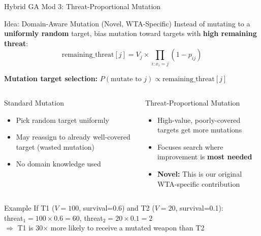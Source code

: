 \documentclass[aspectratio=43,8pt]{beamer}
\begin{document}
\begin{frame}{Hybrid GA Mod 3: Threat-Proportional Mutation}
\begin{block}{Idea: Domain-Aware Mutation (Novel, WTA-Specific)}
Instead of mutating to a \textbf{uniformly random} target, bias mutation toward targets with \textbf{high remaining threat}:
$$\text{remaining\_threat}[j] = V_j \times \prod_{i: x_i = j} (1 - p_{ij})$$

\textbf{Mutation target selection:} $P(\text{mutate to } j) \propto \text{remaining\_threat}[j]$
\end{block}

\vspace{0.2cm}
\begin{columns}[t]
\begin{exampleblock}{Standard Mutation}
\begin{itemize}
    \item Pick random target uniformly
    \item May reassign to already well-covered target (wasted mutation)
    \item No domain knowledge used
\end{itemize}
\end{exampleblock}

\begin{alertblock}{Threat-Proportional Mutation}
\begin{itemize}
    \item High-value, poorly-covered targets get more mutations
    \item Focuses search where improvement is \textbf{most needed}
    \item \textbf{Novel:} This is our original WTA-specific contribution
\end{itemize}
\end{alertblock}
\end{columns}

\vspace{0.2cm}
\begin{block}{Example}
If T1 ($V=100$, survival=0.6) and T2 ($V=20$, survival=0.1): \\
threat$_1 = 100 \times 0.6 = 60$, threat$_2 = 20 \times 0.1 = 2$ \\
$\Rightarrow$ T1 is 30$\times$ more likely to receive a mutated weapon than T2
\end{block}
\end{frame}
\end{document}
